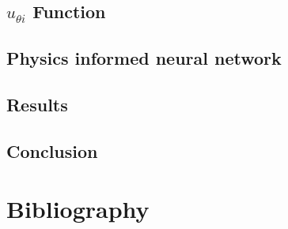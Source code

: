 \documentclass{beamer}
\begin{document}
\subsection{$u_{\theta i}$ Function}


\subsection{Physics informed neural network}



\subsection{Results}





\subsection{Conclusion}


\section{Bibliography}

\end{document}
